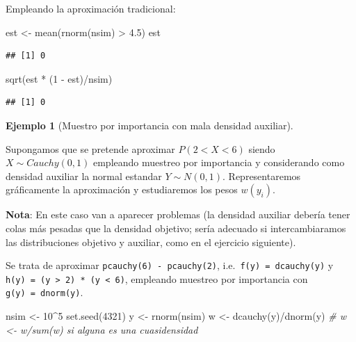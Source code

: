 \documentclass[
]{book}
\newenvironment{Shaded}{\begin{snugshade}}{\end{snugshade}}
\newcommand{\CommentTok}[1]{\textcolor[rgb]{0.56,0.35,0.01}{\textit{#1}}}
\newcommand{\DecValTok}[1]{\textcolor[rgb]{0.00,0.00,0.81}{#1}}
\newcommand{\FloatTok}[1]{\textcolor[rgb]{0.00,0.00,0.81}{#1}}
\newcommand{\FunctionTok}[1]{\textcolor[rgb]{0.00,0.00,0.00}{#1}}
\newcommand{\NormalTok}[1]{#1}
\newcommand{\OtherTok}[1]{\textcolor[rgb]{0.56,0.35,0.01}{#1}}
\newcommand{\SpecialCharTok}[1]{\textcolor[rgb]{0.00,0.00,0.00}{#1}}
\theoremstyle{break}
\theoremstyle{definition}
\theoremstyle{definition}
\newtheorem{example}{Ejemplo}[chapter]
\theoremstyle{definition}
\theoremstyle{definition}
\theoremstyle{remark}
\begin{document}
Empleando la aproximación tradicional:

\begin{Shaded}
\begin{Highlighting}[]
\NormalTok{est }\OtherTok{\textless{}{-}} \FunctionTok{mean}\NormalTok{(}\FunctionTok{rnorm}\NormalTok{(nsim) }\SpecialCharTok{\textgreater{}} \FloatTok{4.5}\NormalTok{)}
\NormalTok{est}
\end{Highlighting}
\end{Shaded}

\begin{verbatim}
## [1] 0
\end{verbatim}

\begin{Shaded}
\begin{Highlighting}[]
\FunctionTok{sqrt}\NormalTok{(est }\SpecialCharTok{*}\NormalTok{ (}\DecValTok{1} \SpecialCharTok{{-}}\NormalTok{ est)}\SpecialCharTok{/}\NormalTok{nsim)}
\end{Highlighting}
\end{Shaded}

\begin{verbatim}
## [1] 0
\end{verbatim}

\begin{example}[Muestro por importancia con mala densidad auxiliar]
\protect\hypertarget{exm:mc-imp2}{}{\label{exm:mc-imp2} {} }
\end{example}

Supongamos que se pretende aproximar \(P\left(2<X<6\right)\) siendo \(X\sim Cauchy(0,1)\) empleando muestreo por importancia y considerando como densidad auxiliar la normal estandar \(Y\sim N(0,1)\). Representaremos gráficamente la aproximación y estudiaremos los pesos \(w(y_i)\).

\textbf{Nota}: En este caso van a aparecer problemas
(la densidad auxiliar debería tener colas más pesadas que la densidad objetivo;
sería adecuado si intercambiaramos las distribuciones objetivo y auxiliar,
como en el ejercicio siguiente).

Se trata de aproximar \texttt{pcauchy(6)\ -\ pcauchy(2)},
i.e.~\texttt{f(y)\ =\ dcauchy(y)} y \texttt{h(y)\ =\ (y\ \textgreater{}\ 2)\ *\ (y\ \textless{}\ 6)},
empleando muestreo por importancia con \texttt{g(y)\ =\ dnorm(y)}.

\begin{Shaded}
\begin{Highlighting}[]
\NormalTok{nsim }\OtherTok{\textless{}{-}} \DecValTok{10}\SpecialCharTok{\^{}}\DecValTok{5}
\FunctionTok{set.seed}\NormalTok{(}\DecValTok{4321}\NormalTok{)}
\NormalTok{y }\OtherTok{\textless{}{-}} \FunctionTok{rnorm}\NormalTok{(nsim)}
\NormalTok{w }\OtherTok{\textless{}{-}} \FunctionTok{dcauchy}\NormalTok{(y)}\SpecialCharTok{/}\FunctionTok{dnorm}\NormalTok{(y) }\CommentTok{\# w \textless{}{-} w/sum(w) si alguna es una cuasidensidad}
\end{Highlighting}
\end{Shaded}
\end{document}
